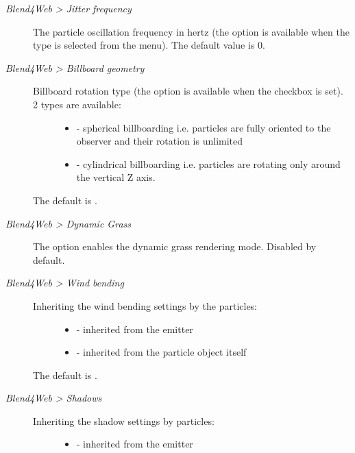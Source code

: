 \documentclass[a4paper,12pt,oneside]{sphinxmanual}
\begin{document}
\begin{description}
\item[{\emph{Blend4Web \textgreater{} Jitter frequency}}] \leavevmode
The particle oscillation frequency in hertz (the option is available when the  type is selected from the  menu). The default value is 0.

\item[{\emph{Blend4Web \textgreater{} Billboard geometry}}] \leavevmode\begin{description}
\item[{Billboard rotation type (the option is available when the  checkbox is set). 2 types are available:}] \leavevmode\begin{itemize}
\item {} 
 - spherical billboarding i.e. particles are fully oriented to the observer and their rotation is unlimited

\item {} 
 - cylindrical billboarding i.e. particles are rotating only around the vertical Z axis.

\end{itemize}

\end{description}

The default is .

\item[{\emph{Blend4Web \textgreater{} Dynamic Grass}}] \leavevmode
The option enables the dynamic grass rendering mode. Disabled by default.

\item[{\emph{Blend4Web \textgreater{} Wind bending}}] \leavevmode\begin{description}
\item[{Inheriting the wind bending settings by the particles:}] \leavevmode\begin{itemize}
\item {} 
 - inherited from the emitter

\item {} 
 - inherited from the particle object itself

\end{itemize}

\end{description}

The default is .

\item[{\emph{Blend4Web \textgreater{} Shadows}}] \leavevmode\begin{description}
\item[{Inheriting the shadow settings by particles:}] \leavevmode\begin{itemize}
\item {} 
 - inherited from the emitter


\end{itemize}
\end{description}
\end{description}
\end{document}
